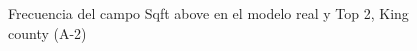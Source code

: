 \begin{figure}[H]
    \centering
    
    \caption{Frecuencia del campo Sqft above en el modelo real y Top 2, King county (A-2)}
    \label{frecuency-top2-sqft above}
\end{figure}